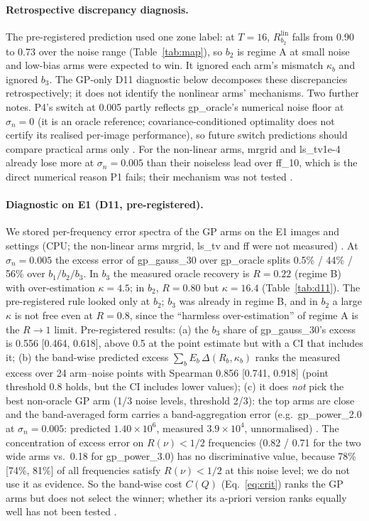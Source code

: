\paragraph{Retrospective discrepancy diagnosis.} The pre-registered prediction used one
zone label: at $T=16$, $R^{\mathrm{lin}}_{b_2}$ falls from 0.90 to 0.73 over
the noise range (Table~\ref{tab:map}), so $b_2$ is regime A at small noise and
low-bias arms were expected to win. It ignored each arm's mismatch $\kappa_b$
and ignored $b_3$. The GP-only D11 diagnostic below decomposes these discrepancies retrospectively; it does not identify the nonlinear arms' mechanisms. Two further
notes. P4's switch at 0.005 partly reflects gp\_oracle's numerical noise floor
at $\sigma_n=0$ (it is an oracle reference; covariance-conditioned optimality does not certify its realised per-image performance), so future switch predictions should compare practical
arms only . For the non-linear arms, mrgrid and ls\_tv1e-4 already
lose more at $\sigma_n=0.005$ than their noiseless lead over ff\_10, which is
the direct numerical reason P1 fails; their mechanism was not tested
.

\paragraph{Diagnostic on E1 (D11, pre-registered).} We stored per-frequency
error spectra of the GP arms on the E1 images and settings (CPU; the
non-linear arms mrgrid, ls\_tv and ff were not measured) . At
$\sigma_n=0.005$ the excess error of gp\_gauss\_30 over gp\_oracle splits
0.5\% / 44\% / 56\% over $b_1/b_2/b_3$. In $b_3$ the measured oracle
recovery is $R=0.22$ (regime B) with over-estimation $\kappa=4.5$; in $b_2$,
$R=0.80$ but $\kappa=16.4$ (Table~\ref{tab:d11}). The pre-registered rule
looked only at $b_2$; $b_3$ was already in regime B, and in $b_2$ a large
$\kappa$ is not free even at $R=0.8$, since the ``harmless over-estimation''
of regime A is the $R\to1$ limit. Pre-registered results: (a) the $b_3$ share
of gp\_gauss\_30's excess is 0.556 [0.464, 0.618], above 0.5 at the point
estimate but with a CI that includes it; (b) the band-wise predicted excess
$\sum_b E_b\,\Delta(R_b,\kappa_b)$ ranks the measured excess over 24 arm--noise
points with Spearman 0.856 [0.741, 0.918] (point threshold 0.8 holds, but the CI includes lower values); (c) it does
\emph{not} pick the best non-oracle GP arm (1/3 noise levels, threshold 2/3):
the top arms are close and the band-averaged form carries a band-aggregation error
(e.g.\ gp\_power\_2.0 at $\sigma_n=0.005$: predicted $1.40\times10^6$,
measured $3.9\times10^4$, unnormalised) . The concentration of excess
error on $R(\nu)<1/2$ frequencies (0.82 / 0.71 for the two wide arms vs.\ 0.18
for gp\_power\_3.0) has no discriminative value, because 78\% [74\%, 81\%] of
all frequencies satisfy $R(\nu)<1/2$ at this noise level; we do not use it
as evidence. So the band-wise cost $C(Q)$ (Eq.~\eqref{eq:crit}) ranks the GP arms but does
not select the winner; whether its a-priori version ranks equally well has not
been tested .

